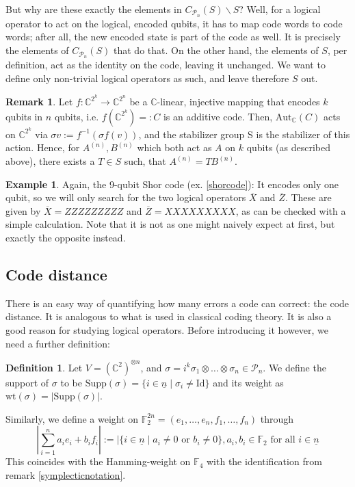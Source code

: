 \documentclass{article}
\def\P{\mathcal{P}}
\def\F{\mathbb{F}}
\def\C{\mathbb{C}}
\def\supp{\text{Supp}}
\def\n{\underline{n}}
\def\fa{\text{ for all }}
\def\Id{\text{Id}}
\def\wt{\text{wt}}
\theoremstyle{definition}
\newtheorem{ex}[Satz]{Example}
\newtheorem{rem}[Satz]{Remark}
\newtheorem{defn}[Satz]{Definition}
\begin{document}
But why are these exactly the elements in $C_{\P_n}(S) \backslash S$? Well, for a logical operator to act on the logical, encoded qubits, it has to map code words to code words; after all, the new encoded state is part of the code as well.
It is precisely the elements of $C_{\P_n}(S)$ that do that. On the other hand, the elements of $S$, per definition, act as the identity on the code, leaving it unchanged. We want to define only non-trivial logical operators as such, and leave therefore $S$ out.

\begin{rem}
Let $f: \C^{2^k} \rightarrow \C^{2^n}$ be a $\C$-linear, injective mapping that encodes $k$ qubits in $n$ qubits, i.e. $f(\C^{2^k})=:C$ is an additive code. Then, $\text{Aut}_\C(C)$ acts on $\C^{2^k}$ via $\sigma v:= f^{-1}(\sigma f(v))$, and the stabilizer group S is the stabilizer of this action.
Hence, for $A^{(n)}, B^{(n)}$ which both act as $A$ on $k$ qubits (as described above), there exists a $T \in S$ such, that $A^{(n)} = T B^{(n)}$.

\end{rem}

\begin{ex}
Again, the 9-qubit Shor code (ex.  \ref{shorcode}): It encodes only one qubit, so we will only search for the two logical operators $\overline{X}$ and $\overline{Z}$. These are given by $\overline{X} = ZZZZZZZZZ$ and $\overline{Z} = XXXXXXXXX$, as can be checked with a simple calculation. Note that it is not as one might naively expect at first, but exactly the opposite instead.
\end{ex}

\subsection{ Code distance}

There is an easy way of quantifying how many errors a code can correct: the code distance. It is analogous to what is used in classical coding theory. It is also a good reason for studying logical operators. Before introducing it however, we need a further definition:

\begin{defn}\label{weight}
Let $V = (\C^2)^{\otimes n}$, and $\sigma = i^k \sigma_1 \otimes \ldots \otimes \sigma_n \in \mathcal{P}_n$. We define the support of $\sigma$ to be $\supp(\sigma) = \{ i \in \underline{n} \mid \sigma_i \neq \Id \}$ and
its weight as $\wt(\sigma) = | \supp( \sigma) |$. 

Similarly, we define a weight on $\F_2^{2n} = (e_1,\ldots,e_n,f_1,\ldots,f_n)$ through \begin{equation} | \sum_{i=1}^n a_i e_i + b_i f_i | := | \{ i \in \n \mid a_i \neq 0 \text{ or } b_i \neq 0 \}, a_i, b_i \in \F_2 \fa i \in \n \end{equation} This coincides with the Hamming-weight on $\F_4$ with the identification from remark \ref{symplecticnotation}.
\end{defn}
\end{document}
